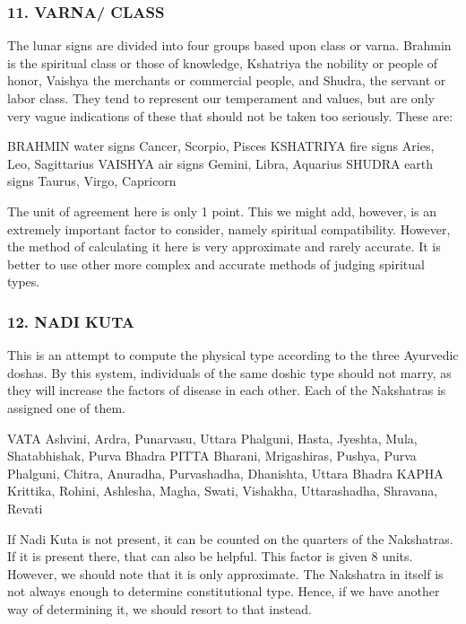  

\subsubsection{11. VARNA/ CLASS}
 

The lunar signs are divided into four groups based upon class or varna. Brahmin is the spiritual class or those of knowledge, Kshatriya the nobility or people of honor, Vaishya the merchants or commercial people, and Shudra, the servant or labor class. They tend to represent our temperament and values, but are only very vague indications of these that should not be taken too seriously. These are:

 

 BRAHMIN	 water signs	 Cancer, Scorpio, Pisces
 KSHATRIYA	 fire signs	 Aries, Leo, Sagittarius
 VAISHYA	 air signs	  Gemini, Libra, Aquarius
 SHUDRA	 earth signs	 Taurus, Virgo, Capricorn
 

The unit of agreement here is only 1 point. This we might add, however, is an extremely important factor to consider, namely spiritual compatibility. However, the method of calculating it here is very approximate and rarely accurate. It is better to use other more complex and accurate methods of judging spiritual types.

 

\subsubsection{12. NADI KUTA}
 

This is an attempt to compute the physical type according to the three Ayurvedic doshas. By this system, individuals of the same doshic type should not marry, as they will increase the factors of disease in each other. Each of the Nakshatras is assigned one of them.

 

VATA
Ashvini, Ardra, Punarvasu, Uttara Phalguni, Hasta, Jyeshta, Mula, Shatabhishak, Purva Bhadra
PITTA
Bharani, Mrigashiras, Pushya, Purva Phalguni, Chitra, Anuradha, Purvashadha, Dhanishta, Uttara Bhadra
KAPHA
Krittika, Rohini, Ashlesha, Magha, Swati, Vishakha, Uttarashadha, Shravana, Revati
 

If Nadi Kuta is not present, it can be counted on the quarters of the Nakshatras. If it is present there, that can also be helpful. This factor is given 8 units. However, we should note that it is only approximate. The Nakshatra in itself is not always enough to determine constitutional type. Hence, if we have another way of determining it, we should resort to that instead.

